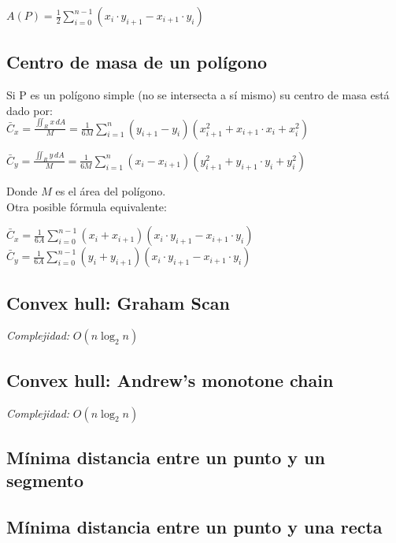 \documentclass[10pt,letterpaper]{article}
\begin{document}
$ A(P) = \frac{1}{2} \displaystyle\sum_{i=0}^{n-1} (x_{i} \cdot y_{i+1} - x_{i+1} \cdot y_{i}) $ \\

\subsection{Centro de masa de un polígono}
Si P es un polígono simple (no se intersecta a sí mismo) su centro de masa está dado por: \\

$ \displaystyle\bar{C}_{x} = \frac{ \displaystyle\iint_{R} x \, dA }{M} = \frac{1}{6M}\sum_{i=1}^{n} (y_{i+1} - y_{i}) (x_{i+1}^2 + x_{i+1} \cdot x_{i} + x_{i}^2) $

\medskip

$\displaystyle\bar{C}_{y} = \frac{ \displaystyle\iint_{R} y \, dA }{M} = \frac{1}{6M} \sum_{i=1}^{n} (x_{i} - x_{i+1}) (y_{i+1}^2 + y_{i+1} \cdot y_{i} + y_{i}^2)$

\medskip

Donde $ M $ es el área del polígono. \\

Otra posible fórmula equivalente:

$ \displaystyle\bar{C}_{x} = \frac{1}{6A} \sum_{i=0}^{n-1} (x_{i} + x_{i+1}) (x_{i} \cdot y_{i+1} - x_{i+1} \cdot y_{i}) $
$ \displaystyle\bar{C}_{y} = \frac{1}{6A} \sum_{i=0}^{n-1} (y_{i} + y_{i+1}) (x_{i} \cdot y_{i+1} - x_{i+1} \cdot y_{i}) $


\subsection{Convex hull: Graham Scan}
\emph{Complejidad:} $ O(n \log_{2}{n}) $

\subsection{Convex hull: Andrew's monotone chain}
\emph{Complejidad:} $ O(n \log_{2}{n}) $

\subsection{Mínima distancia entre un punto y un segmento}

\subsection{Mínima distancia entre un punto y una recta}
\end{document}
